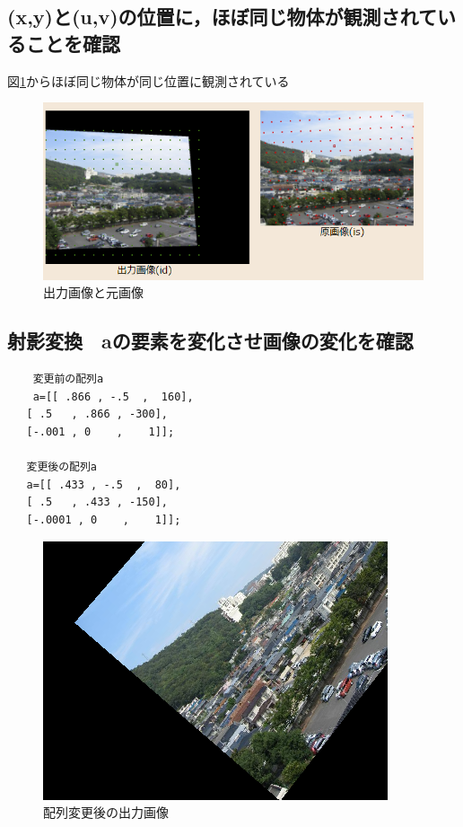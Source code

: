 \documentclass[11pt]{jarticle}
\begin{document}
\subsection{(x,y)と(u,v)の位置に，ほぼ同じ物体が観測されていることを確認}
図\ref{2-1.png}からほぼ同じ物体が同じ位置に観測されている
\begin{figure}[h]
    \centering
    \includegraphics[scale=.5]{2-1.png}
    \caption{出力画像と元画像}
    \label{2-1.png}
\end{figure}

\subsection{射影変換　aの要素を変化させ画像の変化を確認}

\begin{verbatim}
    変更前の配列a
    a=[[ .866 , -.5  ,  160],
   [ .5   , .866 , -300],
   [-.001 , 0    ,    1]];

   変更後の配列a
   a=[[ .433 , -.5  ,  80],
   [ .5   , .433 , -150],
   [-.0001 , 0    ,    1]];
\end{verbatim}
\begin{figure}[h]
    \centering
    \includegraphics[scale=.5]{2-2.png}
    \caption{配列変更後の出力画像}
    \label{2-2.png}
\end{figure}
\end{document}
